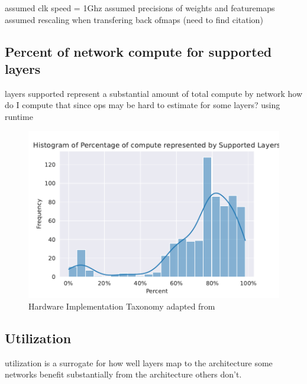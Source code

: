 
assumed clk speed = 1Ghz
assumed precisions of weights and featuremaps
assumed rescaling when transfering back ofmaps (need to find citation)

\subsection{Percent of network compute for supported layers}
\label{chap:hero:sim_platform:cigar_side}

layers supported represent a substantial amount of total compute by network
how do I compute that since ops may be hard to estimate for some layers?
using runtime

\begin{figure}[ht]
    \centering
    \includegraphics[scale=0.58]{Plots/overview/percent.pdf}
    \caption{Hardware Implementation Taxonomy adapted from \cite{maestro}}
    \label{fig:hw_taxonomy}
\end{figure}

\subsection{Utilization}
\label{chap:hero:sim_platform:cigar_side}

utilization is a surrogate for how well layers map to the architecture
some networks benefit substantially from the architecture
others don't. 

